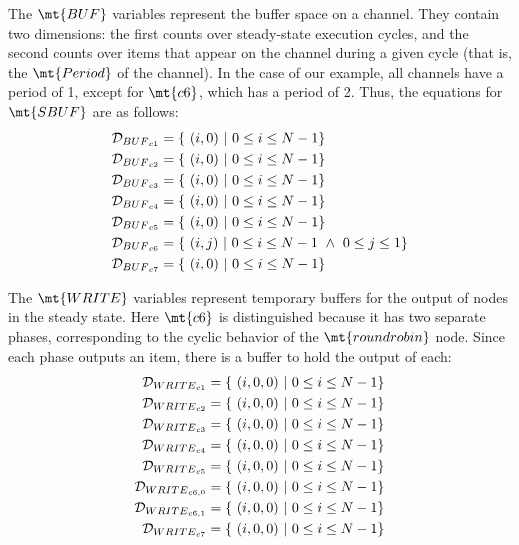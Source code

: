 
The $\mt{BUF}$ variables represent the buffer space on a channel.
They contain two dimensions: the first counts over steady-state
execution cycles, and the second counts over items that appear on the
channel during a given cycle (that is, the $\mt{Period}$ of the
channel).  In the case of our example, all channels have a period of
1, except for $\mt{c6}$, which has a period of 2.  Thus, the equations
for $\mt{SBUF}$ are as follows:
\begin{align*}
{\cal D}_{{BUF}_{c1}} &= \{ ~(i,0)~|~0 \le i \le N - 1\} \\
{\cal D}_{{BUF}_{c2}} &= \{ ~(i,0)~|~0 \le i \le N - 1 \} \\
{\cal D}_{{BUF}_{c3}} &= \{ ~(i,0)~|~0 \le i \le N - 1 \} \\
{\cal D}_{{BUF}_{c4}} &= \{ ~(i,0)~|~0 \le i \le N - 1 \} \\
{\cal D}_{{BUF}_{c5}} &= \{ ~(i,0)~|~0 \le i \le N - 1 \} \\
{\cal D}_{{BUF}_{c6}} &= \{ ~(i,j)~|~0 \le i \le N - 1 ~\wedge~ 0 \le j \le 1 \} \\
{\cal D}_{{BUF}_{c7}} &= \{ ~(i,0)~|~0 \le i \le N - 1\}
\end{align*}


The $\mt{WRITE}$ variables represent temporary buffers for the output
of nodes in the steady state.  Here $\mt{c6}$ is distinguished
because it has two separate phases, corresponding to the cyclic
behavior of the $\mt{roundrobin}$ node.  Since each phase outputs an
item, there is a buffer to hold the output of each:
\begin{align*}
{\cal D}_{{WRITE}_{c1}} &= \{~(i,0,0)~|~0 \le i \le N-1\} \\
{\cal D}_{{WRITE}_{c2}} &= \{~(i,0,0)~|~0 \le i \le N-1 \} \\
{\cal D}_{{WRITE}_{c3}} &= \{~(i,0,0)~|~0 \le i \le N-1 \} \\
{\cal D}_{{WRITE}_{c4}} &= \{~(i,0,0)~|~0 \le i \le N-1 \} \\
{\cal D}_{{WRITE}_{c5}} &= \{~(i,0,0)~|~0 \le i \le N-1 \} \\
{\cal D}_{{WRITE}_{{c6}, 0}} &= \{~(i,0,0)~|~0 \le i \le N-1 \} \\
{\cal D}_{{WRITE}_{{c6}, 1}} &= \{~(i,0,0)~|~0 \le i \le N-1 \} \\
{\cal D}_{{WRITE}_{c7}} &= \{~(i,0,0)~|~0 \le i \le N-1\} 
\end{align*}

